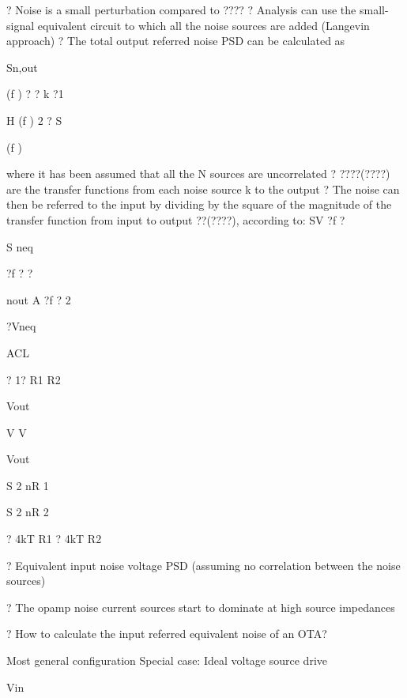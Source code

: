 \documentclass[2pt,landscape]{article}
\begin{document}
\begin{multicols*}{5}
?	Noise is a small perturbation compared to ????
?	Analysis can use the small-signal equivalent circuit to which all the noise 
sources are added (Langevin approach)
?	The total output referred noise PSD can be calculated as


Sn,out


(f ) ? ?
k ?1


H (f ) 2 ? S


(f )


where it has been assumed that all the N sources are uncorrelated
?	????(????) are the transfer functions from each noise source k to the output
?	The noise can then be referred to the input by dividing by the square of the 
magnitude of the transfer function from input to output ??(????), according to:
SV	?f ?


S
neq


?f ? ?



nout	
A ?f ? 
2









?Vneq


ACL


? 1? R1
R2





Vout

V	V





Vout


S	2
nR 1


S 2
nR 2


? 4kT
R1
? 4kT
R2




?	Equivalent input noise voltage PSD (assuming no correlation between 
the noise sources)

?	The opamp noise current sources start to dominate at high source 
impedances



?	How to calculate the input referred equivalent noise of an OTA?

Most general configuration	Special case: Ideal voltage
source drive








Vin








\end{multicols*}
\end{document}

